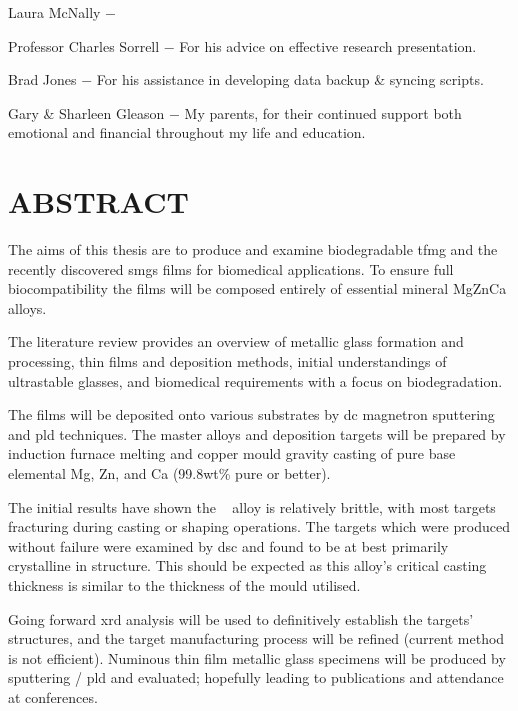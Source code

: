 \documentclass[a4paper,12pt,oneside]{report}%
\begin{document}
Laura McNally $-$

Professor Charles Sorrell $-$ For his advice on effective research presentation.

Brad Jones $-$ For his assistance in developing data backup \& syncing scripts.

Gary \& Sharleen Gleason $-$ My parents, for their continued support both emotional and financial throughout my life and education.


\chapter*{ABSTRACT}

The aims of this thesis are to produce and examine biodegradable \gls{tfmg} and the recently discovered \glspl{smg} films for biomedical applications. To ensure full biocompatibility the films will be composed entirely of essential mineral MgZnCa alloys.

The literature review provides an overview of metallic glass formation and processing, thin films and deposition methods, initial understandings of ultrastable glasses, and biomedical requirements with a focus on biodegradation. 

The films will be deposited onto various substrates by \gls{dc} magnetron sputtering and \gls{pld} techniques. The master alloys and deposition targets will be prepared by induction furnace melting and copper mould gravity casting of pure base elemental Mg, Zn, and Ca (99.8wt\% pure or better).

The initial results have shown the \MgZnCa~ alloy is relatively brittle, with most targets fracturing during casting or shaping operations. The targets which were produced without failure were examined by \acrshort{dsc} and found to be at best primarily crystalline in structure. This should be expected as this alloy's critical casting thickness is similar to the thickness of the mould utilised. 

Going forward \acrshort{xrd} analysis will be used to definitively establish the targets' structures, and the target manufacturing process will be refined (current method is not efficient). Numinous thin film metallic glass specimens will be produced by sputtering / \gls{pld} and evaluated; hopefully leading to publications and attendance at conferences.
\end{document}
